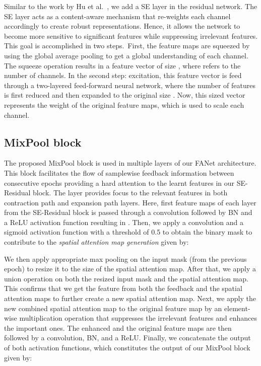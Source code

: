 \documentclass[journal]{IEEEtran}
\begin{document}
Similar to the work by Hu et al.~\cite{Hu_2018_CVPR}, we add a \ac{SE} layer in the residual network. The \ac{SE} layer acts as a content-aware mechanism that re-weights each channel accordingly to create robust representations. Hence, it allows the network to become more sensitive to significant features while suppressing irrelevant features. This goal is accomplished in two steps.~First, the feature maps are squeezed by using the global average pooling to get a global understanding of each channel. The squeeze operation results in a  feature vector of size , where  refers to the number of channels. In the second step: excitation, this feature vector is feed through a two-layered feed-forward neural network, where the number of features is first reduced and then expanded to the original size . Now, this  sized vector represents the weight of the original feature maps, which is used to scale each channel.

\subsection{MixPool block}
The proposed MixPool block is used in multiple layers of our FANet architecture. This block facilitates the flow of samplewise feedback information between consecutive epochs providing a hard attention to the learnt features in our SE-Residual block. The layer provides focus to the relevant features in both contraction path and expansion path layers. Here, first feature maps of each layer from the SE-Residual block  is passed through a  convolution followed by \ac{BN} and a \ac{ReLU} activation function resulting in . Then, we apply a  convolution and a sigmoid activation function  with a threshold of 0.5 to obtain the binary mask  to contribute to the \textit{spatial attention map generation} given by:

We then apply appropriate max pooling on the input mask (from the previous epoch) to resize it to the size of the spatial attention map.  After that, we apply a union operation on both the resized input mask and the spatial attention map. This confirms that we get the feature from both the feedback and the spatial attention maps to further create a new spatial attention map. Next, we apply the new combined spatial attention map to the original feature map by an element-wise multiplication operation that suppresses the irrelevant features and enhances the important ones. The enhanced and the original feature maps are then followed by a  convolution, \ac{BN}, and a \ac{ReLU}. Finally, we concatenate the output of both activation functions, which constitutes the output of our MixPool block given by:
\end{document}
